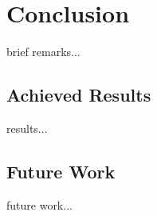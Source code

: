\chapter{Conclusion}

brief remarks... 

\section{Achieved Results}
\label{sec:achieved}

results... 

\section{Future Work}
\label{sec:futureWork}

future work... 

